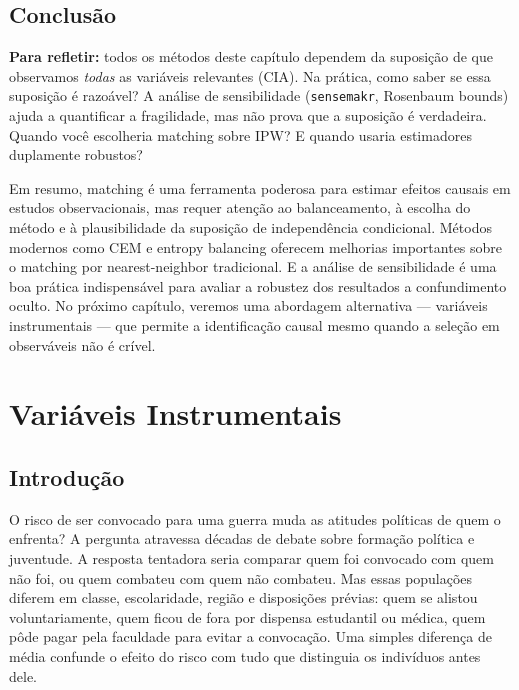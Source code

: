 \documentclass[
]{article}
\begin{document}
\subsection{Conclusão}\label{conclusuxe3o}

\textbf{Para refletir:} todos os métodos deste capítulo dependem da suposição de que observamos \emph{todas} as variáveis relevantes (CIA). Na prática, como saber se essa suposição é razoável? A análise de sensibilidade (\texttt{sensemakr}, Rosenbaum bounds) ajuda a quantificar a fragilidade, mas não prova que a suposição é verdadeira. Quando você escolheria matching sobre IPW? E quando usaria estimadores duplamente robustos?

Em resumo, matching é uma ferramenta poderosa para estimar efeitos causais em estudos observacionais, mas requer atenção ao balanceamento, à escolha do método e à plausibilidade da suposição de independência condicional. Métodos modernos como CEM e entropy balancing oferecem melhorias importantes sobre o matching por nearest-neighbor tradicional. E a análise de sensibilidade é uma boa prática indispensável para avaliar a robustez dos resultados a confundimento oculto. No próximo capítulo, veremos uma abordagem alternativa --- variáveis instrumentais --- que permite a identificação causal mesmo quando a seleção em observáveis não é crível.

\section{Variáveis Instrumentais}\label{variuxe1veis-instrumentais}

\subsection{Introdução}\label{introduuxe7uxe3o-5}

O risco de ser convocado para uma guerra muda as atitudes políticas de quem o enfrenta? A pergunta atravessa décadas de debate sobre formação política e juventude. A resposta tentadora seria comparar quem foi convocado com quem não foi, ou quem combateu com quem não combateu. Mas essas populações diferem em classe, escolaridade, região e disposições prévias: quem se alistou voluntariamente, quem ficou de fora por dispensa estudantil ou médica, quem pôde pagar pela faculdade para evitar a convocação. Uma simples diferença de média confunde o efeito do risco com tudo que distinguia os indivíduos antes dele.
\end{document}
